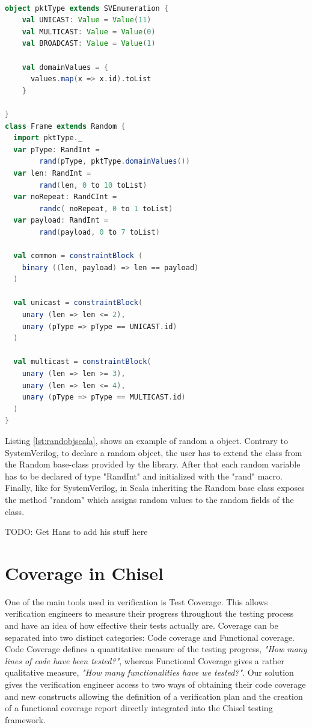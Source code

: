 \documentclass[conference]{IEEEtran}
\newcommand{\todo}[1]{{\color{olive} TODO: #1}}
\begin{document}
\begin{lstlisting}[language=scala, caption={Random object in Scala}, label={lst:randobjscala}]

object pktType extends SVEnumeration {
    val UNICAST: Value = Value(11)
    val MULTICAST: Value = Value(0)
    val BROADCAST: Value = Value(1)
    
    val domainValues = {
      values.map(x => x.id).toList
    }

}
class Frame extends Random {
  import pktType._
  var pType: RandInt = 
        rand(pType, pktType.domainValues())
  var len: RandInt = 
        rand(len, 0 to 10 toList)
  var noRepeat: RandCInt = 
        randc( noRepeat, 0 to 1 toList)
  var payload: RandInt =
        rand(payload, 0 to 7 toList)

  val common = constraintBlock (
    binary ((len, payload) => len == payload)
  )

  val unicast = constraintBlock(
    unary (len => len <= 2),
    unary (pType => pType == UNICAST.id)
  )

  val multicast = constraintBlock(
    unary (len => len >= 3),
    unary (len => len <= 4),
    unary (pType => pType == MULTICAST.id)
  )
}
\end{lstlisting}

Listing \ref{lst:randobjscala}, shows an example of random a object. Contrary to SystemVerilog, to declare a random object, the user has to extend
the class from the Random base-class provided by the library. After that each random variable has to be declared of type "RandInt" and initialized
with the "rand" macro. Finally, like for SystemVerilog, in Scala inheriting the Random base class exposes the method "random" which assigns random
values to the random fields of the class.

\todo{Get Hans to add his stuff here}

\section{Coverage in Chisel}
One of the main tools used in verification is Test Coverage. This allows verification engineers to measure their progress throughout the testing process and have an idea of how effective their tests actually are. Coverage can be separated into two distinct categories: Code coverage and Functional coverage. Code Coverage defines a quantitative measure of the testing progress, \textit{"How many lines of code have been tested?"}, whereas Functional Coverage gives a rather qualitative measure, \textit{"How many functionalities have we tested?"}.  Our solution gives the verification engineer access to two ways of obtaining their code coverage and new constructs allowing the definition of a verification plan and the creation of a functional coverage report directly integrated into the Chisel testing framework.\\
\end{document}
